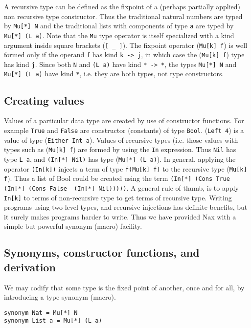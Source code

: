 \vspace*{0.1in}

A recursive type can be defined as the fixpoint of a (perhaps partially applied)
non recursive type constructor. Thus the traditional natural numbers are typed by \verb+Mu[*] N+
and the traditional lists with components of type \verb+a+ are typed by
\verb+Mu[*] (L a)+.  Note that the \verb+Mu+ type operator is itself specialized with a kind argument inside
square brackets (\verb+[ _ ]+). The fixpoint operator (\verb+Mu[k] f+) is well formed only
if the operand \verb+f+ has kind \verb+k -> j+, in which case the (\verb+Mu[k] f+) type
has kind \verb+j+. Since both \verb+N+ and \verb+(L a)+ have kind \verb+* -> *+,
the types  \verb+Mu[*] N+ and \verb+Mu[*] (L a)+ have kind \verb+*+, i.e. they 
are both types, not type constructors.

\subsection{Creating values}

Values of a particular data type are created by use of constructor functions. For
example \verb+True+ and \verb+False+ are constructor (constants) of type \verb+Bool+.
(\verb+Left 4+) is a value of type (\verb+Either Int a+). Values of recursive types
(i.e. those values with types such as (\verb+Mu[k] f+) are formed by using the \verb+In+
expression. Thus \verb+Nil+ has type \verb+L a+, and \verb+(In[*] Nil)+ has type
(\verb+Mu[*] (L a)+). In general, applying the operator \verb+(In[k])+ injects a term of
type \verb+f(Mu[k] f)+ to the recursive type (\verb+Mu[k] f+). Thus a list of Bool could be
created using the term \verb+(In[*] (Cons True  (In[*] (Cons False  (In[*] Nil)))))+. 
A general rule of thumb, is to apply \verb+In[k]+ to terms of non-recursive type
to get terms of recursive type. Writing programs using two level types, and recursive
injections has definite benefits, but it surely makes programs harder to write. Thus
we have provided Nax with a simple but powerful synonym (macro) facility.

\subsection{Synonyms, constructor functions, and derivation}\label{macro}

We may codify that some type is the fixed point of another, once and for all, by introducing
a type synonym (macro).

{\small
\begin{verbatim}
synonym Nat = Mu[*] N
synonym List a = Mu[*] (L a)     
\end{verbatim}}

